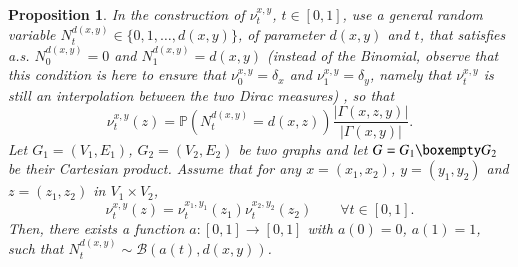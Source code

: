 \documentclass[11pt]{amsart}
\newtheorem{prop}[equation]{Proposition}
\numberwithin{equation}{section}
\begin{document}
\begin{prop}\label{loident}
In the construction of $\nu_t^{x,y}$, $t \in [0,1]$, use a general random variable $N_t^{d(x,y)} \in \{0,1,\dots,d(x,y)\}$, of parameter $d(x,y)$ and $t$, that satisfies a.s. $N_0^{d(x,y)} = 0$ and $N_1^{d(x,y)} = d(x,y)$ (instead of the Binomial, observe that this condition is here to ensure that $\nu_0^{x,y}=\delta_x$ and $\nu_1^{x,y}=\delta_y$, namely that $\nu_t^{x,y}$ is still an interpolation between the two Dirac measures) , so that
\begin{equation*} 
\nu_t^{x,y}(z)= {\mathbb{P}}\left( N_t^{d(x,y)} = d(x,z) \right) \frac{| \Gamma(x,z,y)|}{| \Gamma(x,y)|} .
\end{equation*}
Let $G_1=(V_1,E_1)$, $G_2=(V_2,E_2)$ be two graphs and let $G=G_1 \boxempty G_2$ be their Cartesian product.
Assume that for any $x=(x_1,x_2)$, $y=(y_1,y_2)$ and $z=(z_1,z_2)$ in $V_1 \times V_2$,
$$
\nu^{x,y}_t(z)=\nu^{x_1,y_1}_t(z_1)\nu^{x_2,y_2}_t(z_2) \qquad \forall t \in [0,1].
$$
Then, there exists a function $a \colon [0,1] \to [0,1]$ with $a(0)=0$, $a(1)=1$, such that $N_t^{d(x,y)} \sim \mathcal{B}(a(t),d(x,y))$.
\end{prop}
\end{document}
